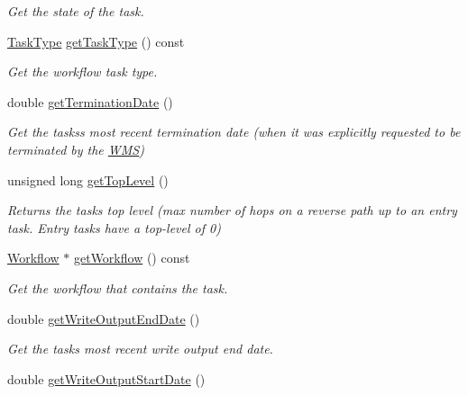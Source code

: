 \begin{DoxyCompactItemize}
\begin{DoxyCompactList}\small\item\em Get the state of the task. \end{DoxyCompactList}\item 
\hyperlink{classwrench_1_1_workflow_task_a490a935259b9425a3e4fb011a86cb4bf}{Task\+Type} \hyperlink{classwrench_1_1_workflow_task_ac9ad03bc492dd9a827c43e13e079e08c}{get\+Task\+Type} () const
\begin{DoxyCompactList}\small\item\em Get the workflow task type. \end{DoxyCompactList}\item 
double \hyperlink{classwrench_1_1_workflow_task_a864c86e8bb6de6ab16106169ec0a2cc2}{get\+Termination\+Date} ()
\begin{DoxyCompactList}\small\item\em Get the tasks\textquotesingle{}s most recent termination date (when it was explicitly requested to be terminated by the \hyperlink{classwrench_1_1_w_m_s}{W\+MS}) \end{DoxyCompactList}\item 
unsigned long \hyperlink{classwrench_1_1_workflow_task_a07fd9a09e51649fe32aedd22166b1047}{get\+Top\+Level} ()
\begin{DoxyCompactList}\small\item\em Returns the task\textquotesingle{}s top level (max number of hops on a reverse path up to an entry task. Entry tasks have a top-\/level of 0) \end{DoxyCompactList}\item 
\hyperlink{classwrench_1_1_workflow}{Workflow} $\ast$ \hyperlink{classwrench_1_1_workflow_task_aea29ebd47e1e3a1b955fafc0e72dff50}{get\+Workflow} () const
\begin{DoxyCompactList}\small\item\em Get the workflow that contains the task. \end{DoxyCompactList}\item 
double \hyperlink{classwrench_1_1_workflow_task_aa9a538645c4946f7a257d66a80d45401}{get\+Write\+Output\+End\+Date} ()
\begin{DoxyCompactList}\small\item\em Get the task\textquotesingle{}s most recent write output end date. \end{DoxyCompactList}\item 
double \hyperlink{classwrench_1_1_workflow_task_a2905c939f467778439fea8a956b0381b}{get\+Write\+Output\+Start\+Date} ()

\end{DoxyCompactItemize}
